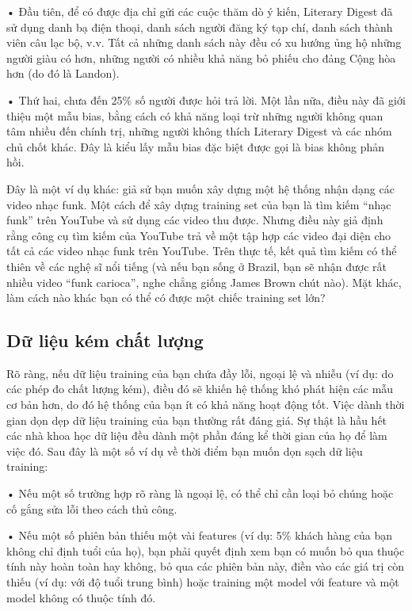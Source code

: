 • Đầu tiên, để có được địa chỉ gửi các cuộc thăm dò ý kiến, Literary Digest đã sử dụng danh bạ điện thoại, danh sách người đăng ký tạp chí, danh sách thành viên câu lạc bộ, v.v. Tất cả những danh sách này đều có xu hướng ủng hộ những người giàu có hơn, những người có nhiều khả năng bỏ phiếu cho đảng Cộng hòa hơn (do đó là Landon).

• Thứ hai, chưa đến 25\% số người được hỏi trả lời. Một lần nữa, điều này đã giới thiệu một mẫu bias, bằng cách có khả năng loại trừ những người không quan tâm nhiều đến chính trị, những người không thích Literary Digest và các nhóm chủ chốt khác. Đây là kiểu lấy mẫu bias đặc biệt được gọi là bias không phản hồi.

Đây là một ví dụ khác: giả sử bạn muốn xây dựng một hệ thống nhận dạng các video nhạc funk. Một cách để xây dựng training set của bạn là tìm kiếm “nhạc funk” trên YouTube và sử dụng các video thu được. Nhưng điều này giả định rằng công cụ tìm kiếm của YouTube trả về một tập hợp các video đại diện cho tất cả các video nhạc funk trên YouTube. Trên thực tế, kết quả tìm kiếm có thể thiên về các nghệ sĩ nổi tiếng (và nếu bạn sống ở Brazil, bạn sẽ nhận được rất nhiều video “funk carioca”, nghe chẳng giống James Brown chút nào). Mặt khác, làm cách nào khác bạn có thể có được một chiếc training set lớn?

\subsection{Dữ liệu kém chất lượng}

Rõ ràng, nếu dữ liệu training của bạn chứa đầy lỗi, ngoại lệ và nhiễu (ví dụ: do các phép đo chất lượng kém), điều đó sẽ khiến hệ thống khó phát hiện các mẫu cơ bản hơn, do đó hệ thống của bạn ít có khả năng hoạt động tốt. Việc dành thời gian dọn dẹp dữ liệu training của bạn thường rất đáng giá. Sự thật là hầu hết các nhà khoa học dữ liệu đều dành một phần đáng kể thời gian của họ để làm việc đó. Sau đây là một số ví dụ về thời điểm bạn muốn dọn sạch dữ liệu training:

• Nếu một số trường hợp rõ ràng là ngoại lệ, có thể chỉ cần loại bỏ chúng hoặc cố gắng sửa lỗi theo cách thủ công.

• Nếu một số phiên bản thiếu một vài features (ví dụ: 5\% khách hàng của bạn không chỉ định tuổi của họ), bạn phải quyết định xem bạn có muốn bỏ qua thuộc tính này hoàn toàn hay không, bỏ qua các phiên bản này, điền vào các giá trị còn thiếu (ví dụ: với độ tuổi trung bình) hoặc training một model với feature và một model không có thuộc tính đó.

